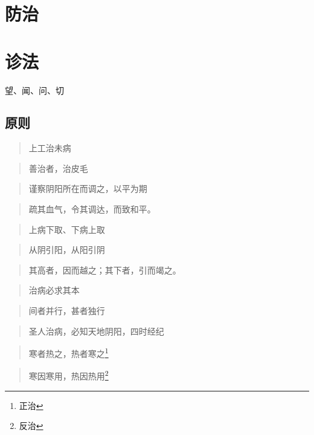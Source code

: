 \section{防治}

\section{诊法}
望、闻、问、切

\subsection{原则}
\begin{quote}
  上工治未病
\end{quote}
\begin{quote}
  善治者，治皮毛
\end{quote}
\begin{quote}
  谨察阴阳所在而调之，以平为期
\end{quote}
\begin{quote}
  疏其血气，令其调达，而致和平。
\end{quote}
\begin{quote}
  上病下取、下病上取
\end{quote}
\begin{quote}
  从阴引阳，从阳引阴
\end{quote}
\begin{quote}
  其高者，因而越之；其下者，引而竭之。
\end{quote}
\begin{quote}
  治病必求其本
\end{quote}
\begin{quote}
  间者并行，甚者独行
\end{quote}
\begin{quote}
  圣人治病，必知天地阴阳，四时经纪
\end{quote}
\begin{quote}
  寒者热之，热者寒之\footnote{正治}
\end{quote}
\begin{quote}
  寒因寒用，热因热用\footnote{反治}
\end{quote}
